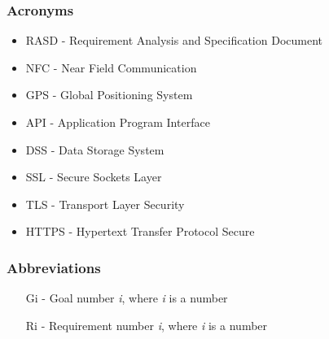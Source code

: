 \subsubsection{Acronyms}
\begin{itemize}
\item RASD - Requirement Analysis and Specification Document
\item NFC - Near Field Communication
\item GPS - Global Positioning System
\item API - Application Program Interface
\item DSS - Data Storage System
\item SSL - Secure Sockets Layer
\item TLS - Transport Layer Security
\item HTTPS - Hypertext Transfer Protocol Secure
\end{itemize}

\subsubsection{Abbreviations}
\begin{itemize}
\item [Gi] - Goal number \textit{i}, where \textit{i} is a number
\item [Ri] - Requirement number \textit{i}, where \textit{i} is a number
\end{itemize}
